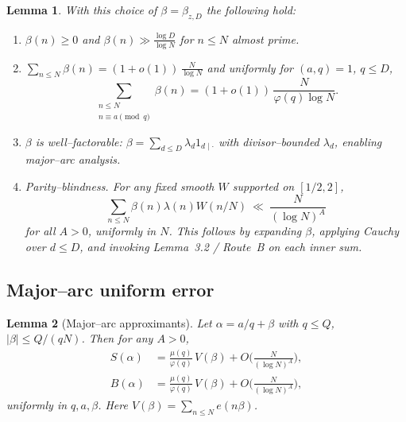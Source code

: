\documentclass[11pt]{article}
\newtheorem{lemma}{Lemma}[part]
\theoremstyle{definition}
\theoremstyle{remark}
\numberwithin{equation}{part}
\begin{document}
\begin{lemma}\label{lem:beta-properties}
	With this choice of $\beta=\beta_{z,D}$ the following hold:
	\begin{enumerate}[label=(B\arabic*)]
		\item $\beta(n)\ge 0$ and $\beta(n)\gg \frac{\log D}{\log N}$ for $n\le N$ almost prime.
		\item $\sum_{n\le N}\beta(n)=(1+o(1))\,\tfrac{N}{\log N}$ and uniformly for $(a,q)=1$, $q\le D$,
		      \[
			      \sum_{\substack{n\le N\\ n\equiv a\pmod q}}\beta(n)
			      =(1+o(1))\,\frac{N}{\varphi(q)\log N}.
		      \]
		\item $\beta$ is well--factorable: $\beta=\sum_{d\le D}\lambda_d 1_{d\mid\cdot}$ with divisor--bounded $\lambda_d$, enabling major--arc analysis.
		\item \emph{Parity--blindness.} For any fixed smooth $W$ supported on $[1/2,2]$,
		      \[
			      \sum_{n\le N}\beta(n)\lambda(n)W(n/N)
			      \ \ll\ \frac{N}{(\log N)^A}
		      \]
		      for all $A>0$, uniformly in $N$. This follows by expanding $\beta$, applying Cauchy over $d\le D$, and invoking Lemma~3.2 / Route~B on each inner sum.
	\end{enumerate}
\end{lemma}

\subsection{Major--arc uniform error}

\begin{lemma}[Major--arc approximants]\label{lem:major-errors}
	Let $\alpha=a/q+\beta$ with $q\le Q$, $|\beta|\le Q/(qN)$. Then for any $A>0$,
	\begin{align*}
		S(\alpha) & =\frac{\mu(q)}{\varphi(q)}\,V(\beta)+O\!\Big(\frac{N}{(\log N)^A}\Big), \\
		B(\alpha) & =\frac{\mu(q)}{\varphi(q)}\,V(\beta)+O\!\Big(\frac{N}{(\log N)^A}\Big),
	\end{align*}
	uniformly in $q,a,\beta$. Here $V(\beta)=\sum_{n\le N}e(n\beta)$.
\end{lemma}
\end{document}
